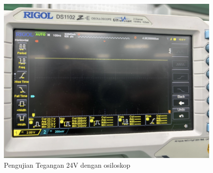 \begin{figure}[H]
	\centering
	\includegraphics[scale=0.5]{gambar/bab4/osii.png}
	\caption{Pengujian Tegangan 24V dengan osiloskop}
	\label{fig:pengujian_tegangan} 
\end{figure}

